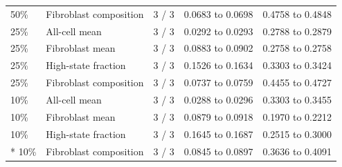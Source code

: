 \documentclass[10pt,a4paper]{article}
\begin{document}
{{\begin{longtable}{@{}p{25mm}p{48mm}p{26mm}p{35mm}p{33mm}@{}}
50\% & Fibroblast composition & 3 / 3 & 0.0683 to 0.0698 & 0.4758 to 0.4848 \\
25\% & All-cell mean & 3 / 3 & 0.0292 to 0.0293 & 0.2788 to 0.2879 \\
25\% & Fibroblast mean & 3 / 3 & 0.0883 to 0.0902 & 0.2758 to 0.2758 \\
25\% & High-state fraction & 3 / 3 & 0.1526 to 0.1634 & 0.3303 to 0.3424 \\
25\% & Fibroblast composition & 3 / 3 & 0.0737 to 0.0759 & 0.4455 to 0.4727 \\
10\% & All-cell mean & 3 / 3 & 0.0288 to 0.0296 & 0.3303 to 0.3455 \\
10\% & Fibroblast mean & 3 / 3 & 0.0879 to 0.0918 & 0.1970 to 0.2212 \\
10\% & High-state fraction & 3 / 3 & 0.1645 to 0.1687 & 0.2515 to 0.3000 \\*
10\% & Fibroblast composition & 3 / 3 & 0.0845 to 0.0897 & 0.3636 to 0.4091 \\
\end{longtable}
}

}
\end{document}
